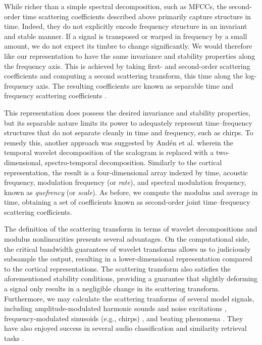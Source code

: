 \documentclass[10pt,letterpaper]{article}
\begin{document}
While richer than a simple spectral decomposition, such as MFCCs, the second-order time scattering coefficients described above primarily capture structure in time.
Indeed, they do not explicitly encode frequency structure in an invariant and stable manner.
If a signal is transposed or warped in frequency by a small amount, we do not expect its timbre to change significantly.
We would therefore like our representation to have the same invariance and stability properties along the frequency axis.
This is achieved by taking first- and second-order scattering coefficients and computing a second scattering transform, this time along the log-frequency axis.
The resulting coefficients are known as separable time and frequency scattering coefficients \cite{anden2014deep}.

This representation does possess the desired invariance and stability properties, but its separable nature limits its power to adequately represent time--frequency structures that do not separate cleanly in time and frequency, such as chirps.
To remedy this, another approach was suggested by And\'{e}n et al. \cite{anden2015joint,anden2019joint} wherein the temporal wavelet decomposition of the scalogram is replaced with a two-dimensional, spectro-temporal decomposition.
Similarly to the cortical representation, the result is a four-dimensional array indexed by time, acoustic frequency, modulation frequency (or \emph{rate}), and spectral modulation frequency, known as \emph{quefrency} (or \emph{scale}).
As before, we compute the modulus and average in time, obtaining a set of coefficients known as second-order joint time--frequency scattering coefficients.

The definition of the scattering transform in terms of wavelet decompositions and modulus nonlinearities presents several advantages.
On the computational side, the critical bandwidth guarantees of wavelet transforms allows us to judiciously subsample the output, resulting in a lower-dimensional representation compared to the cortical representations.
The scattering transform also satisfies the aforementioned stability conditions, providing a guarantee that slightly deforming a signal only results in a negligible change in its scattering transform.
Furthermore, we may calculate the scattering tranforms of several model signals, including amplitude-modulated harmonic sounds and noise excitations \cite{anden2012scattering,anden2014deep}, frequency-modulated sinusoids (e.g., chirps) \cite{anden2012scattering,anden2019joint}, and beating phenomena \cite{anden2014deep}.
They have also enjoyed success in several audio classification and similarity retrieval tasks \cite{anden2011multiscale,bauge2013representing,anden2014deep,anden2019joint,lostanlen2018relevance,lostanlen2018extended}.
\end{document}
